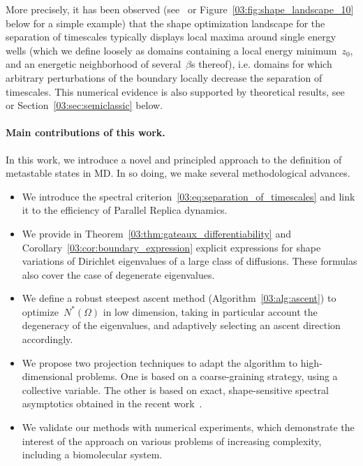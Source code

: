     More precisely, it has been observed (see~\cite{PUV15} or Figure~\ref{03:fig:shape_landscape_10} below for a simple example) that the shape optimization landscape for the separation of timescales typically displays local maxima around single energy wells (which we define loosely as domains containing a local energy minimum~$z_0$, and an energetic neighborhood of several~$\beta$s thereof), i.e. domains for which arbitrary perturbations of the boundary locally decrease the separation of timescales.
    This numerical evidence is also supported by theoretical results, see~\cite[Section 3.3]{BLS25a} or Section~\ref{03:sec:semiclassic} below.

    \paragraph{Main contributions of this work.}
    In this work, we introduce a novel and principled approach to the definition of metastable states in MD. In so doing, we make several methodological advances.
\begin{itemize}
    \item{We introduce the spectral criterion~\eqref{03:eq:separation_of_timescales} and link it to the efficiency of Parallel Replica dynamics.}
    \item{We provide in Theorem~\ref{03:thm:gateaux_differentiability} and Corollary~\ref{03:cor:boundary_expression} explicit expressions for shape variations of Dirichlet eigenvalues of a large class of diffusions. These formulas also cover the case of degenerate eigenvalues.}
    \item{We define a robust steepest ascent method (Algorithm~\ref{03:alg:ascent}) to optimize~$N^*(\Omega)$ in low dimension, taking in particular account the degeneracy of the eigenvalues, and adaptively selecting an ascent direction accordingly.}
    \item{We propose two projection techniques to adapt the algorithm to high-dimensional problems. One is based on a coarse-graining strategy, using a collective variable. The other is based on exact, shape-sensitive spectral asymptotics obtained in the recent work~\cite{BLS25a}.}
    \item{We validate our methods with numerical experiments, which demonstrate the interest of the approach on various problems of increasing complexity, including a biomolecular system.}
\end{itemize}

